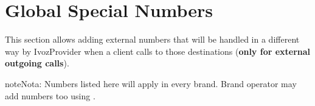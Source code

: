 \documentclass[letterpaper,10pt,spanish]{sphinxmanual}
\begin{document}
\section{Global Special Numbers}
\label{administration_portal/platform/global_special_numbers:global-special-numbers}\label{administration_portal/platform/global_special_numbers::doc}\label{administration_portal/platform/global_special_numbers:id1}
This section allows adding external numbers that will be handled in a different way by IvozProvider when a client
calls to those destinations (\textbf{only for external outgoing calls}).

\begin{notice}{note}{Nota:}
Numbers listed here will apply in every brand. Brand operator may add numbers too using {\hyperref[administration_portal/brand/settings/special_numbers:special\string-numbers]{}}.
\end{notice}
\end{document}
